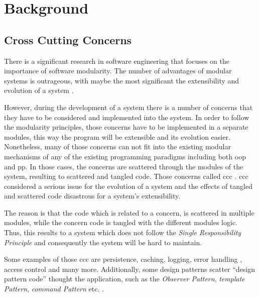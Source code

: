 
\chapter{Background}\label{Background}

\section{Cross Cutting Concerns}\label{Cross Cutting Concerns}
There is a significant research in software engineering that focuses on the importance of software modularity. 
The number of advantages of modular systems is outrageous, with maybe the most significant the extensibility and evolution of a system \cite{parnas1972criteria}.

However, during the development of a system there is a number of concerns that they have to be considered and implemented into the system. 
In order to follow the modularity principles, those concerns have to be implemented in a separate modules, this way the program will be extensible and its evolution easier.
Nonetheless, many of those concerns can not fit into the existing modular mechanisms of any of the existing programming paradigms including both \ac{oop} and \ac{pp}. 
In those cases, the concerns are scattered through the modules of the system, resulting to scattered and tangled code. 
Those concerns called \acrlong{ccc} \cite{hannemann2005role}.
\ac{ccc} considered a serious issue for the evolution of a system and the effects of tangled and scattered code disastrous for a system's extensibility.

The reason is that the code which is related to a concern, is scattered in multiple modules, while the concern code is tangled with the different modules logic. 
Thus, this results to a system which does not follow the \textit{Single Responsibility Principle} and consequently the system will be hard to maintain.

Some examples of those \ac{ccc} are persistence, caching, logging, error handling \cite{lippert2000study}, access control and many more. 
Additionally, some design patterns scatter ``design pattern code'' thought the application, such as the \textit{Observer Pattern}, \textit{template Pattern}, \textit{command Pattern} etc. \cite{hannemann2002design} \cite{marin2004refactoring}.

